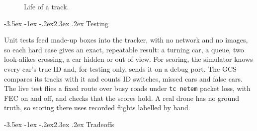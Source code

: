 \documentclass[11pt]{article}
\makeatletter
\renewcommand\section{\@startsection{section}{1}{\z@}%
  {-3.5ex \@plus -1ex \@minus -.2ex}{2.3ex \@plus .2ex}%
  {\normalfont\Large\bfseries\color{accent}}}
\makeatother
\begin{document}
\begin{figure}[htbp]
\centering
{}
\caption{Life of a track.}
\label{fig:life}
\end{figure}

\section{Testing}
\label{sec:testing}

Unit tests feed made-up boxes into the tracker, with no network and no
images, so each hard case gives an exact, repeatable result: a turning car,
a queue, two look-alikes crossing, a car hidden or out of view. For scoring,
the simulator knows every car's true ID and, for testing only, sends it on a
debug port. The GCS compares its tracks with it and counts ID switches,
missed cars and false cars. The live test flies a fixed route over busy
roads under \texttt{tc netem} packet loss, with FEC on and off, and checks
that the scores hold. A real drone has no ground truth, so scoring there
uses recorded flights labelled by hand.

\section{Tradeoffs}
\end{document}
